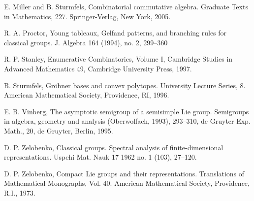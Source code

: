 \documentclass[11pt]{amsart}
\numberwithin{equation}{subsection}
\begin{document}
\begin{thebibliography}{DEP82}
 E. Miller and B. Sturmfels, Combinatorial commutative
algebra. Graduate Texts in Mathematics, 227. Springer-Verlag, New York, 2005.


 R. A. Proctor, Young tableaux, Gelfand patterns, and
branching rules for classical groups. J. Algebra 164 (1994), no. 2, 299--360

 R. P. Stanley, Enumerative Combinatorics, Volume I,
Cambridge Studies in Advanced Mathematics 49, Cambridge University Press,
1997.

 B. Sturmfels, Gr\"{o}bner bases and convex polytopes.
University Lecture Series, 8. American Mathematical Society, Providence, RI, 1996.

 E. B. Vinberg, The asymptotic semigroup of a semisimple Lie group. 
Semigroups in algebra, geometry and analysis (Oberwolfach, 1993), 293--310, 
de Gruyter Exp. Math., 20, de Gruyter, Berlin, 1995. 

 D. P. Zelobenko, Classical groups. Spectral analysis of finite-dimensional 
representations. Uspehi Mat. Nauk 17 1962 no. 1 (103), 27--120.

 D. P. Zelobenko, Compact Lie groups and their representations. 
Translations of Mathematical Monographs, Vol. 40. American Mathematical Society, 
Providence, R.I., 1973.

\end{thebibliography}
\end{document}
